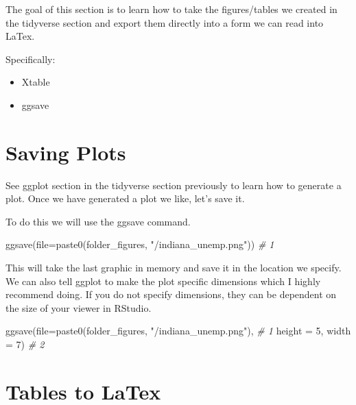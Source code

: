 \documentclass[
]{book}
\newenvironment{Shaded}{\begin{snugshade}}{\end{snugshade}}
\newcommand{\AttributeTok}[1]{\textcolor[rgb]{0.77,0.63,0.00}{#1}}
\newcommand{\CommentTok}[1]{\textcolor[rgb]{0.56,0.35,0.01}{\textit{#1}}}
\newcommand{\DecValTok}[1]{\textcolor[rgb]{0.00,0.00,0.81}{#1}}
\newcommand{\FunctionTok}[1]{\textcolor[rgb]{0.00,0.00,0.00}{#1}}
\newcommand{\NormalTok}[1]{#1}
\newcommand{\StringTok}[1]{\textcolor[rgb]{0.31,0.60,0.02}{#1}}
\providecommand{\tightlist}{%
  \setlength{\itemsep}{0pt}\setlength{\parskip}{0pt}}
\begin{document}
The goal of this section is to learn how to take the figures/tables we created in the tidyverse section and export them directly into a form we can read into LaTex.

Specifically:

\begin{itemize}
\tightlist
\item
  Xtable
\item
  ggsave
\end{itemize}

\hypertarget{saving-plots}{%
\section{Saving Plots}\label{saving-plots}}

See ggplot section in the tidyverse section previously to learn how to generate a plot. Once we have generated a plot we like, let's save it.

To do this we will use the ggsave command.

\begin{Shaded}
\begin{Highlighting}[]
\FunctionTok{ggsave}\NormalTok{(}\AttributeTok{file=}\FunctionTok{paste0}\NormalTok{(folder\_figures, }\StringTok{"/indiana\_unemp.png"}\NormalTok{))      }\CommentTok{\# 1}
\end{Highlighting}
\end{Shaded}

This will take the last graphic in memory and save it in the location we specify. We can also tell ggplot to make the plot specific dimensions which I highly recommend doing. If you do not specify dimensions, they can be dependent on the size of your viewer in RStudio.

\begin{Shaded}
\begin{Highlighting}[]
\FunctionTok{ggsave}\NormalTok{(}\AttributeTok{file=}\FunctionTok{paste0}\NormalTok{(folder\_figures, }\StringTok{"/indiana\_unemp.png"}\NormalTok{),   }\CommentTok{\# 1}
  \AttributeTok{height =} \DecValTok{5}\NormalTok{, }\AttributeTok{width =} \DecValTok{7}\NormalTok{)                                    }\CommentTok{\# 2}
\end{Highlighting}
\end{Shaded}

\hypertarget{tables-to-latex}{%
\section{Tables to LaTex}\label{tables-to-latex}}
\end{document}
